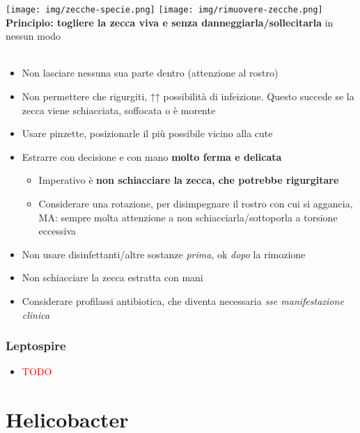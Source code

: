 \documentclass[italian,]{article}
\providecommand{\tightlist}{%
  \setlength{\itemsep}{0pt}\setlength{\parskip}{0pt}}
\newcommand{\greenbox}[2]{\begin{tcolorbox}[title=#1,colback=green!5,colframe=green!35!black]#2\end{tcolorbox}} %
\newcommand{\TODO}[1]{\textcolor{red}{\textsf{\footnotesize{TODO #1}}}} %
\begin{document}
\greenbox{Come togliere le zecche}{


\texttt{[image: img/zecche-specie.png]}
\texttt{[image: img/rimuovere-zecche.png]}
\\
\textbf{Principio: togliere la zecca viva e senza danneggiarla/sollecitarla} in nessun modo\\
\\
\begin{itemize}
\tightlist
\item Non lasciare nessuna sua parte dentro (attenzione al rostro)
\item Non permettere che rigurgiti, ↑↑ possibilità di infeizione. Questo succede se la zecca viene schiacciata, soffocata o è morente
\item Usare pinzette, posizionarle il più possibile vicino alla cute
\item Estrarre con decisione e con mano \textbf{molto ferma e delicata}

  \begin{itemize}
  \tightlist
  \item Imperativo è \textbf{non schiacciare la zecca, che potrebbe rigurgitare}
  \item Considerare una rotazione, per disimpegnare il rostro con cui si aggancia, MA: sempre molta attenzione a non schiacciarla/sottoporla a torsione eccessiva
  \end{itemize}
\item Non usare disinfettanti/altre sostanze \emph{prima}, ok \emph{dopo} la rimozione
\item Non schiacciare la zecca estratta con mani
\item Considerare profilassi antibiotica, che diventa necessaria \emph{sse manifestazione clinica}
\end{itemize}
}

\hypertarget{leptospire}{%
\subsubsection{Leptospire}\label{leptospire}}

\begin{itemize}
\item
  \TODO{}
\end{itemize}

\hypertarget{helicobacter}{%
\section{Helicobacter}\label{helicobacter}}
\end{document}
